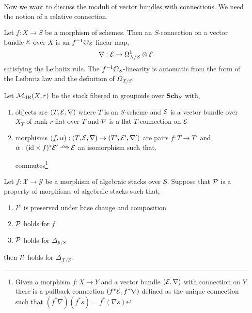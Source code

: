 \documentclass[12pt]{article}
\begin{document}
Now we want to discuss the moduli of vector bundles with connections. We need the notion of a relative connection.

\begin{defn}
Let $f : X \to S$ be a morphism of schemes. Then an $S$-connection on a vector bundle $\mathcal{E}$ over $X$ is an $f^{-1} \mathcal{O}_{S}$-linear map,
\[ \nabla : \mathcal{E} \to \Omega^1_{X/S} \otimes \mathcal{E} \]
satisfying the Leibnitz rule. The $f^{-1} \mathcal{O}_{S}$-linearity is automatic from the form of the Leibnitz law and the definition of $\Omega_{X/S}$.
\end{defn}

\begin{defn}
Let $\mathcal{M}_{\mathrm{dR}}(X, r)$ be the stack fibered in groupoids over $\mathbf{Sch}_S$ with,
\begin{enumerate}
\item objects are $(T, \mathcal{E}, \nabla)$ where $T$ is an $S$-scheme and $\mathcal{E}$ is a vector bundle over $X_T$ of rank $r$ flat over $T$ and $\nabla$ is a flat $T$-connection on $\mathcal{E}$
\item morphisms $(f, \alpha) : (T, \mathcal{E}, \nabla) \to (T', \mathcal{E}', \nabla')$ are pairs $f : T \to T'$ and $\alpha : (\id \times f)^* \E' \iso \E$ an isomorphism such that,
\begin{center}
\end{center}
commutes\footnote{Given a morphism $f : X \to Y$ and a vector bundle $(\mathcal{E}, \nabla)$ with connection on $Y$ there is a pullback connection $(f^* \mathcal{E}, f^* \nabla)$ defined as the unique connection such that $(f^* \nabla) (f^* s) = f^* (\nabla s)$ }
\end{enumerate}
\end{defn}

\renewcommand{\X}{\mathcal{X}}
\newcommand{\Y}{\mathcal{Y}}

\begin{lemma}
Let $f : \X \to \Y$ be a morphism of algebraic stacks over $S$. Suppose that $\mathcal{P}$ is a property of morphisms of algebraic stacks such that,
\begin{enumerate}
\item $\mathcal{P}$ is preserved under base change and composition
\item $\mathcal{P}$ holds for $f$
\item $\mathcal{P}$ holds for $\Delta_{\Y/S}$
\end{enumerate}
then $\mathcal{P}$ holds for $\Delta_{\X/S}$.
\end{lemma}
\end{document}
